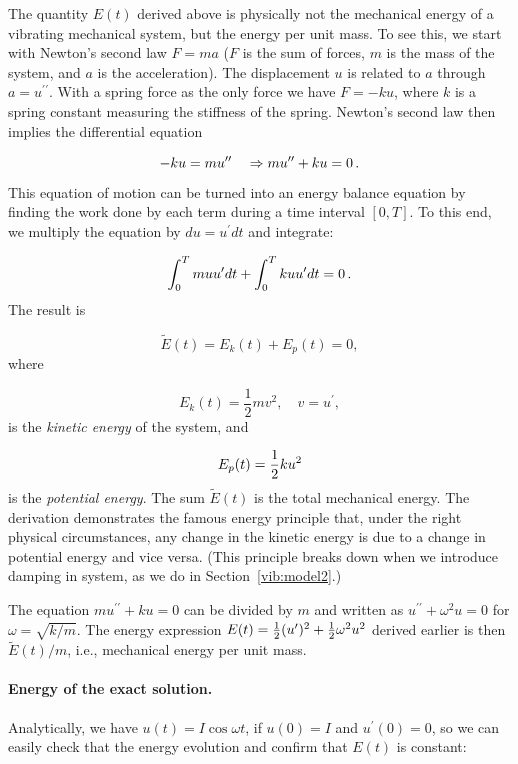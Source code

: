 \documentclass[%
oneside,                 %
final,                   %
10pt]{article}
\newenvironment{warning_mdfboxadmon}[1][]{
\begin{warning_mdfboxmdframed}[frametitle=#1]
}
{
\end{warning_mdfboxmdframed}
}
\begin{document}
\begin{warning_mdfboxadmon}
The quantity $E(t)$ derived above is physically not the mechanical energy of a
vibrating mechanical system, but the energy per unit mass. To see this,
we start with Newton's second law $F=ma$ ($F$ is the sum of forces, $m$
is the mass of the system, and $a$ is the acceleration).
The displacement $u$ is related to $a$ through
$a=u^{\prime\prime}$. With a spring force as the only force we have $F=-ku$, where
$k$ is a spring constant measuring the stiffness of the spring.
Newton's second law then implies the differential equation

\[ -ku = mu^{\prime\prime}\quad\Rightarrow mu^{\prime\prime} + ku = 0\tp\]
This equation of motion can be turned into an energy balance equation
by finding the work done by each term during a time interval $[0,T]$.
To this end, we multiply the equation by $du=u^{\prime}dt$ and integrate:

\[ \int_0^T muu^{\prime}dt + \int_0^T kuu^{\prime}dt = 0\tp\]
The result is

\[ \tilde E(t) = E_k(t) + E_p(t) = 0,\]
where

\begin{equation}
E_k(t) = \frac{1}{2}mv^2,\quad v=u^{\prime},
\label{vib:model1:energy:kinetic}
\end{equation}
is the \emph{kinetic energy} of the system, and

\begin{equation}
E_p(t) = {\half}ku^2
\label{vib:model1:energy:potential}
\end{equation}
is the \emph{potential energy}. The sum $\tilde E(t)$ is the total mechanical energy.
The derivation demonstrates the famous energy principle that, under
the right physical circumstances, any
change in the kinetic energy is due to a change in potential energy
and vice versa. (This principle breaks down when we introduce damping
in system, as we do in Section~\ref{vib:model2}.)

The equation $mu^{\prime\prime}+ku=0$ can be divided by $m$ and written as
$u^{\prime\prime} + \omega^2u=0$ for $\omega=\sqrt{k/m}$. The energy expression
$E(t)=\half(u^{\prime})^2 + \half\omega^2u^2$ derived earlier is then
$\tilde E(t)/m$, i.e., mechanical energy per unit mass.
\end{warning_mdfboxadmon}



\paragraph{Energy of the exact solution.}
Analytically, we have $u(t)=I\cos\omega t$, if $u(0)=I$ and $u^{\prime}(0)=0$,
so we can easily check that the energy evolution and confirm that $E(t)$
is constant:
\end{document}
